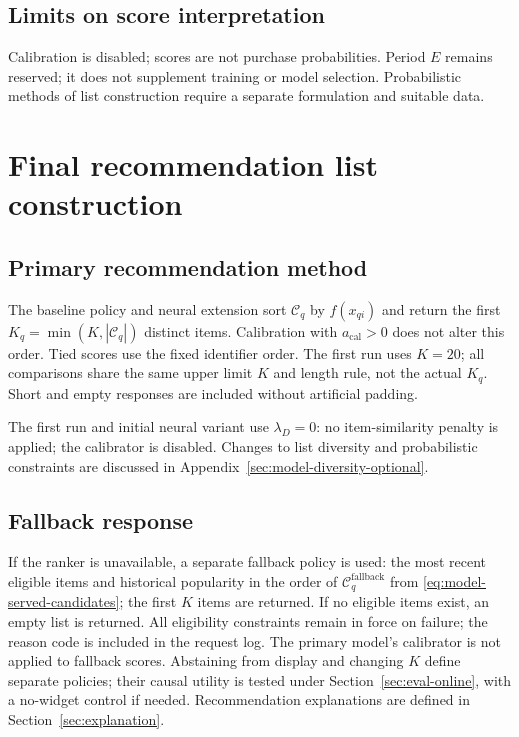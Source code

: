 \documentclass[12pt,a4paper]{article}
\theoremstyle{plainru}
\begin{document}
\subsection{Limits on score interpretation}\label{sec:model-calibration}

Calibration is disabled; scores are not purchase probabilities.
Period $E$ remains reserved; it does not supplement training
or model selection. Probabilistic methods of list construction
require a separate formulation and suitable data.

\section{Final recommendation list construction}\label{sec:model-slate}

\subsection{Primary recommendation method}

The baseline policy and neural extension sort $\mathcal C_q$ by $f(x_{qi})$
and return the first $K_q=\min(K,|\mathcal C_q|)$ distinct items.
Calibration with $a_{\mathrm{cal}}>0$ does not alter this order.
Tied scores use the fixed identifier
order. The first run uses \(K=20\); all comparisons share
the same upper limit $K$ and length rule, not the actual $K_q$.
Short and empty responses are included without artificial padding.

The first run and initial neural variant use \(\lambda_D=0\):
no item-similarity penalty is applied; the calibrator is disabled.
Changes to list diversity and probabilistic constraints are discussed in Appendix~\ref{sec:model-diversity-optional}.

\subsection{Fallback response}

If the ranker is unavailable, a separate fallback
policy is used: the most recent eligible items and historical popularity
in the order of $\mathcal C_q^{\mathrm{fallback}}$ from
\eqref{eq:model-served-candidates}; the first $K$ items are returned.
If no eligible items exist,
an empty list is returned. All eligibility constraints
remain in force on failure; the reason code is included in the request log.
The primary model's calibrator is not applied to fallback scores.
Abstaining from display and changing $K$ define separate policies;
their causal utility is tested under Section~\ref{sec:eval-online},
with a no-widget control if needed.
Recommendation explanations are defined in Section~\ref{sec:explanation}.
\end{document}
